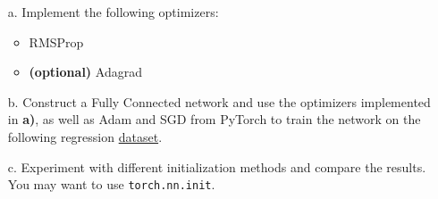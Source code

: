 

\begin{problem}

    \begin{enumerate}

\item[a.] Implement the following optimizers:
\begin{itemize}
    \item RMSProp
    \item \textbf{(optional)} Adagrad
\end{itemize}


\item[b.] Construct a Fully Connected network and use the optimizers implemented in \textbf{a)}, as well as Adam and SGD from PyTorch to train the network on the following regression {\color{blue}\href{https://scikit-learn.org/stable/modules/generated/sklearn.datasets.fetch_california_housing.html}{dataset}}.

\item[c.] Experiment with different initialization methods and compare the results. You may want to use \verb|torch.nn.init|.
    \end{enumerate}
\end{problem}